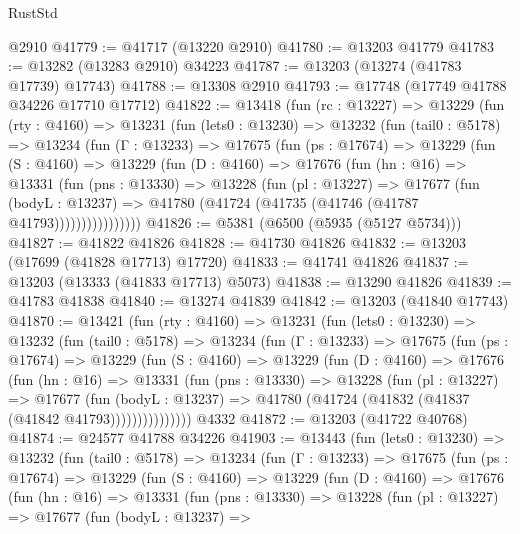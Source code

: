 \begin{lexlean}{RustStd}
\begin{coremodule}
    @2910
@41779 := @41717 (@13220 @2910)
@41780 := @13203 @41779
@41783 := @13282 (@13283 @2910) @34223
@41787 := @13203 (@13274 (@41783 @17739) @17743)
@41788 := @13308 @2910
@41793 := @17748 (@17749 @41788 @34226 @17710 @17712)
@41822 := @13418
    (fun (rc : @13227) =>
    @13229
      (fun (rty : @4160) =>
      @13231
        (fun (lets0 : @13230) =>
        @13232
          (fun (tail0 : @5178) =>
          @13234
            (fun (Γ : @13233) =>
            @17675
              (fun (ps : @17674) =>
              @13229
                (fun (S : @4160) =>
                @13229
                  (fun (D : @4160) =>
                  @17676
                    (fun (hn : @16) =>
                    @13331
                      (fun (pns : @13330) =>
                      @13228
                        (fun (pl : @13227) =>
                        @17677
                          (fun (bodyL : @13237) =>
                          @41780 (@41724 (@41735 (@41746 (@41787 @41793))))))))))))))))
@41826 := @5381 (@6500 (@5935 (@5127 @5734)))
@41827 := @41822 @41826
@41828 := @41730 @41826
@41832 := @13203 (@17699 (@41828 @17713) @17720)
@41833 := @41741 @41826
@41837 := @13203 (@13333 (@41833 @17713) @5073)
@41838 := @13290 @41826
@41839 := @41783 @41838
@41840 := @13274 @41839
@41842 := @13203 (@41840 @17743)
@41870 := @13421
    (fun (rty : @4160) =>
    @13231
      (fun (lets0 : @13230) =>
      @13232
        (fun (tail0 : @5178) =>
        @13234
          (fun (Γ : @13233) =>
          @17675
            (fun (ps : @17674) =>
            @13229
              (fun (S : @4160) =>
              @13229
                (fun (D : @4160) =>
                @17676
                  (fun (hn : @16) =>
                  @13331
                    (fun (pns : @13330) =>
                    @13228
                      (fun (pl : @13227) =>
                      @17677
                        (fun (bodyL : @13237) =>
                        @41780 (@41724 (@41832 (@41837 (@41842 @41793)))))))))))))))
    @4332
@41872 := @13203 (@41722 @40768)
@41874 := @24577 @41788 @34226
@41903 := @13443
    (fun (lets0 : @13230) =>
    @13232
      (fun (tail0 : @5178) =>
      @13234
        (fun (Γ : @13233) =>
        @17675
          (fun (ps : @17674) =>
          @13229
            (fun (S : @4160) =>
            @13229
              (fun (D : @4160) =>
              @17676
                (fun (hn : @16) =>
                @13331
                  (fun (pns : @13330) =>
                  @13228
                    (fun (pl : @13227) =>
                    @17677
                      (fun (bodyL : @13237) =>

\end{coremodule}
\end{lexlean}
